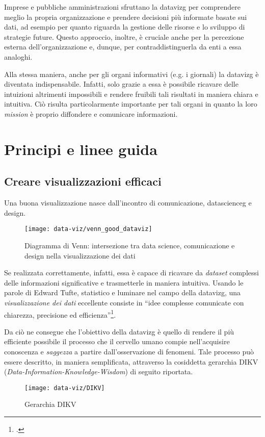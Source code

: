 Imprese e pubbliche amministrazioni sfruttano la \gls{datavizg} per comprendere meglio la propria organizzazione e 
prendere decisioni più informate basate sui dati, ad esempio per quanto riguarda la gestione delle risorse e lo sviluppo di strategie future. 
Questo approccio, inoltre, è cruciale anche per la percezione esterna dell'organizzazione e, dunque, per contraddistinguerla da enti a essa analoghi.

Alla stessa maniera, anche per gli organi informativi (e.g. i giornali) la \gls{datavizg} è diventata indispensabile. 
Infatti, solo grazie a essa è possibile ricavare delle intuizioni altrimenti impossibili e rendere fruibili 
tali risultati in maniera chiara e intuitiva. Ciò risulta particolarmente importante per tali organi in quanto la loro \emph{mission} è proprio diffondere 
e comunicare informazioni.



\section{Principi e linee guida}
\subsection{Creare visualizzazioni efficaci}
Una buona visualizzazione nasce dall'incontro di comunicazione, \gls{datascienceg} e design.
\begin{figure}[H] 
    \centering 
    \texttt{[image: data-viz/venn\_good\_dataviz]} 
    \caption{Diagramma di Venn: intersezione tra data science, comunicazione e design nella visualizzazione dei dati}
    \label{fig:venn_good_dataviz}
\end{figure}

\noindent Se realizzata correttamente, infatti, essa è capace di ricavare da \emph{dataset} complessi delle informazioni significative e trasmetterle in maniera intuitiva.
Usando le parole di Edward Tufte, statistico e luminare nel campo della \gls{datavizg}, una \emph{visualizzazione dei dati} eccellente consiste in
``idee complesse comunicate con chiarezza, precisione ed efficienza''\footcite{tufte:vis_display}.

Da ciò ne consegue che l'obiettivo della \gls{datavizg} è quello di rendere il più efficiente possibile il processo che il cervello
umano compie nell'acquisire conoscenza e \emph{saggezza} a partire dall'osservazione di fenomeni.
Tale processo può essere descritto, in maniera semplificata, attraverso la cosiddetta gerarchia DIKV (\emph{Data-Information-Knowledge-Wisdom}) di seguito riportata.
\begin{figure}[H] 
    \centering 
    \texttt{[image: data-viz/DIKV]} 
    \caption{Gerarchia DIKV}
    \label{fig:DIKV}
\end{figure}

